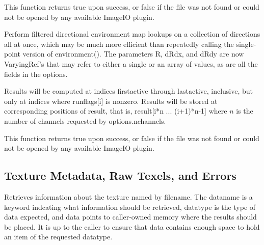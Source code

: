 This function returns {\cf true} upon success, or {\cf false} if the
file was not found or could not be opened by any available ImageIO
plugin.
\apiend


Perform filtered directional environment map lookups on a collection of
directions all at once, which may be much more efficient than repeatedly
calling the single-point version of {\cf environment()}.  The parameters
{\cf R}, {\cf dRdx}, and {\cf dRdy} are now {\cf VaryingRef}'s that may
refer to either a single or an array of values, as are all the fields in
the {\cf options}.

Results will be computed at indices {\cf firstactive} through
{\cf lastactive}, inclusive, but only at indices where {\cf runflags[i]}
is nonzero.  Results will be stored at corresponding positions of
{\cf result}, that is, {\cf result[i*n ... (i+1)*n-1]} where $n$ 
is the number of channels requested by {\cf options.nchannels}.

This function returns {\cf true} upon success, or {\cf false} if the
file was not found or could not be opened by any available ImageIO
plugin.
\apiend

\newpage
\subsection{Texture Metadata, Raw Texels, and Errors}
\label{sec:texturesys:api:gettextureinfo}
\label{sec:texturesys:api:getimagespec}
\label{sec:texturesys:api:geterror}


Retrieves information about the texture named by {\cf filename}.
The {\cf dataname} is a keyword indcating what information should
be retrieved, {\cf datatype} is the type of data expected, and
{\cf data} points to caller-owned memory where the results should be
placed.  It is up to the caller to ensure that {\cf data} contains
enough space to hold an item of the requested {\cf datatype}.

